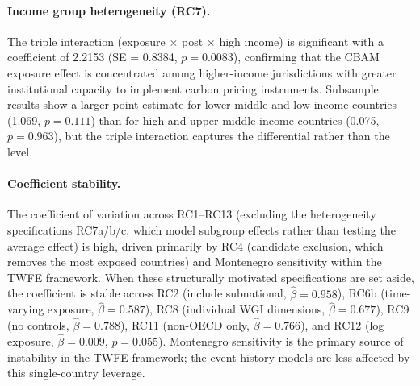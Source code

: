 \documentclass[12pt,a4paper]{article}
\begin{document}
\paragraph{Income group heterogeneity (RC7).} The triple interaction (exposure $\times$ post $\times$ high income) is significant with a coefficient of 2.2153 (SE = 0.8384, $p = 0.0083$), confirming that the CBAM exposure effect is concentrated among higher-income jurisdictions with greater institutional capacity to implement carbon pricing instruments. Subsample results show a larger point estimate for lower-middle and low-income countries (1.069, $p = 0.111$) than for high and upper-middle income countries (0.075, $p = 0.963$), but the triple interaction captures the differential rather than the level.

\paragraph{Coefficient stability.} The coefficient of variation across RC1--RC13 (excluding the heterogeneity specifications RC7a/b/c, which model subgroup effects rather than testing the average effect) is high, driven primarily by RC4 (candidate exclusion, which removes the most exposed countries) and Montenegro sensitivity within the TWFE framework. When these structurally motivated specifications are set aside, the coefficient is stable across RC2 (include subnational, $\hat{\beta} = 0.958$), RC6b (time-varying exposure, $\hat{\beta} = 0.587$), RC8 (individual WGI dimensions, $\hat{\beta} = 0.677$), RC9 (no controls, $\hat{\beta} = 0.788$), RC11 (non-OECD only, $\hat{\beta} = 0.766$), and RC12 (log exposure, $\hat{\beta} = 0.009$, $p = 0.055$). Montenegro sensitivity is the primary source of instability in the TWFE framework; the event-history models are less affected by this single-country leverage.
\end{document}
